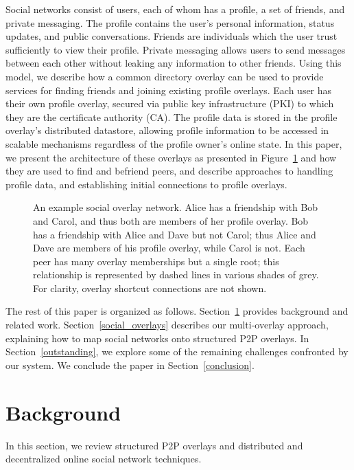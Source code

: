 \documentclass[letterpaper,twocolumn,10pt]{article}
\begin{document}
Social networks consist of users, each of whom has a profile, a set
of friends, and private messaging.  The profile contains the user's
personal information, status updates, and public conversations.  Friends are
individuals which the user trust sufficiently to view their profile.  Private
messaging allows users to send messages between each other without leaking any
information to other friends.  Using this model, we describe how a common
directory overlay can be used to provide services for finding friends and
joining existing profile overlays.  Each user has their own profile overlay,
secured via public key infrastructure (PKI) to which they are the certificate
authority (CA).  The profile data is stored in the profile overlay's distributed
datastore, allowing profile information to be accessed in scalable mechanisms
regardless of the profile owner's online state.  In this paper, we present
the architecture of these overlays as presented in Figure~\ref{fig:system} and
how they are used to find and befriend peers, and describe approaches to
handling profile data, and establishing initial connections to profile overlays.

\begin{figure}[ht]
\centering
{}
\caption{An example social overlay network.  Alice has a friendship with Bob and
Carol, and thus both are members of her profile overlay. Bob has a 
friendship with Alice and Dave but not Carol; thus Alice and Dave are members of
his profile overlay, while Carol is not.  Each peer has many overlay memberships
but a single root; this relationship is represented by dashed lines in various
shades of grey.  For clarity, overlay shortcut connections are not shown.}
\label{fig:system}
\end{figure}

The rest of this paper is organized as follows.  Section~\ref{background}
provides background and related work.  Section~\ref{social_overlays} describes
our multi-overlay approach, explaining how to map social networks onto structured
P2P overlays.  In Section~\ref{outstanding}, we explore some of the remaining
challenges confronted by our system.  We conclude the paper in
Section~\ref{conclusion}.

\section{Background}
\label{background}
In this section, we review structured P2P overlays and distributed and
decentralized online social network techniques.
\end{document}
